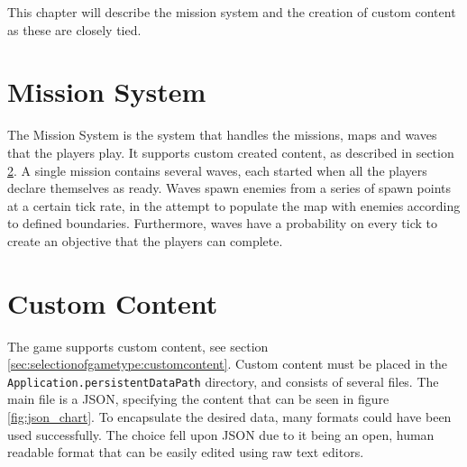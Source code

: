 This chapter will describe the mission system and the creation of custom content as these are closely tied.

\section{Mission System}

The Mission System is the system that handles the missions, maps and waves that the players play.
It supports custom created content, as described in section \ref{sec:modules:missions:customcontent}.
A single mission contains several waves, each started when all the players declare themselves as ready.
Waves spawn enemies from a series of spawn points at a certain tick rate, in the attempt to populate the map with enemies according to defined boundaries.
Furthermore, waves have a probability on every tick to create an objective that the players can complete.

\section{Custom Content}\label{sec:modules:missions:customcontent}

The game supports custom content, see section \ref{sec:selectionofgametype:customcontent}.
Custom content must be placed in the \lstinline|Application.persistentDataPath| directory, and consists of several files.
The main file is a JSON, specifying the content that can be seen in figure \ref{fig:json_chart}.
To encapsulate the desired data, many formats could have been used successfully.
The choice fell upon JSON due to it being an open, human readable format that can be easily edited using raw text editors.

